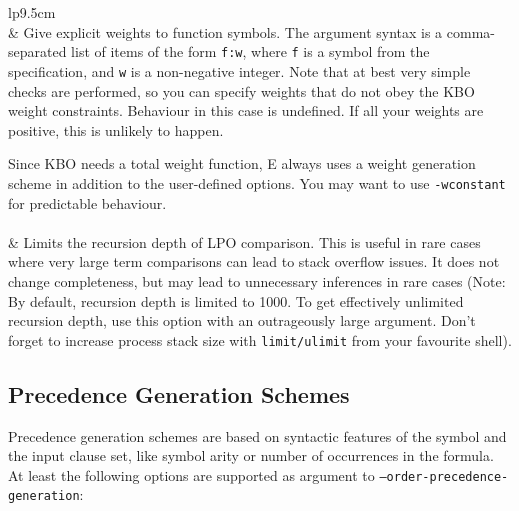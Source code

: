\documentclass{report}
\begin{document}
\begin{supertabular}{lp{9.5cm}}
  \\
  & Give explicit weights to function symbols. The argument syntax is
  a comma-separated list of items of the form \texttt{f:w}, where
  \texttt{f} is a symbol from the specification, and \texttt{w} is a
  non-negative integer. Note that at best very simple checks are
  performed, so you can specify weights that do not obey the KBO
  weight constraints. Behaviour in this case is undefined. If all your
  weights are positive, this is unlikely to happen.

  Since KBO needs a total weight function, E always uses a weight
  generation scheme in addition to the user-defined options. You may
  want to use \texttt{-wconstant} for predictable behaviour.\\[1ex]

  \\
  & Limits the recursion depth of LPO comparison. This is useful in rare
  cases where very large term comparisons can lead to stack overflow
  issues. It does not change completeness, but may lead to unnecessary
  inferences in rare cases (Note: By default, recursion depth is
  limited to 1000. To get effectively unlimited recursion depth, use
  this option with an outrageously large argument. Don't forget to
  increase process stack size with \texttt{limit/ulimit} from your
  favourite shell).\\
\end{supertabular}

\subsection{Precedence Generation Schemes}

Precedence generation schemes are based on syntactic features of the
symbol and the input clause set, like symbol arity or number of
occurrences in the formula. At least the following options are
supported as argument to \texttt{--order-precedence-generation}:
\end{document}
